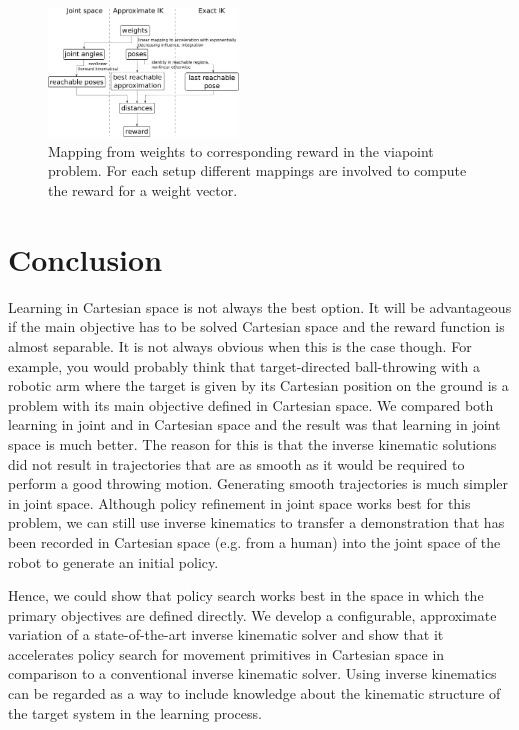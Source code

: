 \documentclass{article}
\begin{document}
\begin{figure}
\includegraphics[width=0.45\textwidth]{mapping}
\centering
\caption{
Mapping from weights to corresponding reward in the viapoint problem.
For each setup different mappings are involved to compute the reward for
a weight vector.
}
\label{fig:mapping}
\end{figure}

\section{Conclusion}

Learning in Cartesian space is not always the best option.
It will be advantageous if the main objective has to be solved
Cartesian space and the reward function is almost separable.
It is not always obvious when this is the case though. For example, you would
probably think that target-directed ball-throwing with a robotic arm where
the target is given by its Cartesian position on the ground is a problem with
its main objective defined in Cartesian space.
We compared both learning in joint and in Cartesian space and the result was
that learning in joint space is much better. The reason for this is that the
inverse kinematic solutions did not result in trajectories that are as smooth
as it would be required to perform a good throwing motion.
Generating smooth trajectories is much simpler in joint space. Although policy
refinement in joint space works best for this problem, we can still use inverse
kinematics to transfer a demonstration that has been recorded in Cartesian
space (e.g. from a human) into the joint space of the robot to generate an
initial policy.

Hence, we could show that policy search works best in the space in which the
primary objectives are defined directly. We develop a configurable,
approximate variation of a state-of-the-art inverse kinematic solver and show
that it accelerates policy search for movement primitives in Cartesian space
in comparison to a conventional inverse kinematic solver. Using inverse
kinematics can be regarded as a way to include knowledge about the
kinematic structure of the target system in the learning process.



\appendix



\end{document}
